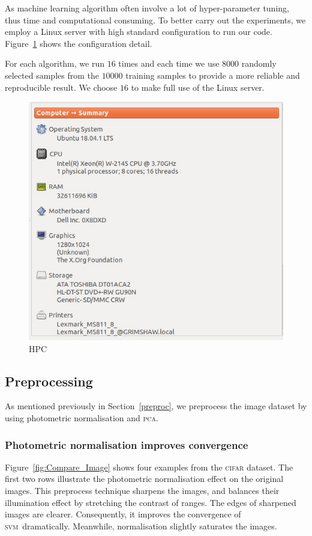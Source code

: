 \documentclass[12pt]{article} %
\newcommand{\svm}{\textsc{svm}}
\begin{document}
As machine learning algorithm often involve a lot of hyper-parameter tuning, thus time and computational consuming. To better carry out the experiments, we employ a Linux server with high standard configuration to run our code. Figure~\ref{fig:HPC} shows the configuration detail. 

For each algorithm, we run $16$ times and each time we use $8000$ randomly selected samples from the $10000$ training samples to provide a more reliable and reproducible result. We choose $16$ to make full use of the Linux server.
\begin{figure}
    \centering
	\includegraphics[scale=.5]{hpc}
	\caption{HPC}
	\label{fig:HPC}
\end{figure}

\subsection{Preprocessing}
As mentioned previously in Section~\ref{preproc}, we preprocess the image dataset by using photometric normalisation and \textsc{pca}. 

\subsubsection{Photometric normalisation improves convergence}

Figure~\ref{fig:Compare_Image} shows four examples from the 
\textsc{cifar} dataset. The first two rows illustrate the photometric normalisation effect on the original images. This preprocess technique sharpens the images, and balances their illumination effect by stretching the contrast of ranges. 
The edges of sharpened images are clearer.
Consequently, it improves the convergence of \svm\ dramatically. Meanwhile, normalisation slightly saturates the images.    
\end{document}
